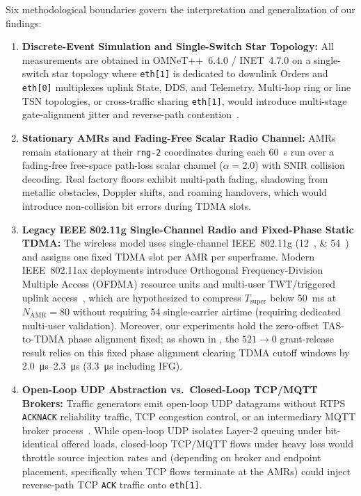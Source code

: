\documentclass[11pt,a4paper]{article}
\newcommand{\Namr}{\ensuremath{N_{\mathrm{AMR}}}}
\newcommand{\Tsuper}{\ensuremath{T_{\mathrm{super}}}}
\begin{document}
Six methodological boundaries govern the interpretation and generalization of our findings:
\begin{enumerate}[leftmargin=2.0em]
    \item \textbf{Discrete-Event Simulation and Single-Switch Star Topology:} All measurements are obtained in OMNeT++~6.4.0 / INET~4.7.0 on a single-switch star topology where \texttt{eth[1]} is dedicated to downlink Orders and \texttt{eth[0]} multiplexes uplink State, DDS, and Telemetry. Multi-hop ring or line TSN topologies, or cross-traffic sharing \texttt{eth[1]}, would introduce multi-stage gate-alignment jitter and reverse-path contention~\cite{seijo2022sharp}.
    \item \textbf{Stationary AMRs and Fading-Free Scalar Radio Channel:} AMRs remain stationary at their \texttt{rng-2} coordinates during each \qty{60}{\second} run over a fading-free free-space path-loss scalar channel ($\alpha=2.0$) with SNIR collision decoding. Real factory floors exhibit multi-path fading, shadowing from metallic obstacles, Doppler shifts, and roaming handovers, which would introduce non-collision bit errors during TDMA slots.
    \item \textbf{Legacy IEEE 802.11g Single-Channel Radio and Fixed-Phase Static TDMA:} The wireless model uses single-channel IEEE~802.11g (\qtylist{12;54}{\mbps}) and assigns one fixed TDMA slot per AMR per superframe. Modern IEEE~802.11ax deployments introduce Orthogonal Frequency-Division Multiple Access (OFDMA) resource units and multi-user TWT/triggered uplink access~\cite{cavalcanti2019extending}, which are hypothesized to compress $\Tsuper$ below \qty{50}{\milli\second} at $\Namr=80$ without requiring \qty{54}{\mbps} single-carrier airtime (requiring dedicated multi-user validation). Moreover, our experiments hold the zero-offset TAS-to-TDMA phase alignment fixed; as shown in , the $521 \to 0$ grant-release result relies on this fixed phase alignment clearing TDMA cutoff windows by \qtyrange{2.0}{2.3}{\micro\second} (\qty{3.3}{\micro\second} including IFG).
    \item \textbf{Open-Loop UDP Abstraction vs.\ Closed-Loop TCP/MQTT Brokers:} Traffic generators emit open-loop UDP datagrams without RTPS \texttt{ACKNACK} reliability traffic, TCP congestion control, or an intermediary MQTT broker process~\cite{omgrtps, mqtt5}. While open-loop UDP isolates Layer-2 queuing under bit-identical offered loads, closed-loop TCP/MQTT flows under heavy loss would throttle source injection rates and (depending on broker and endpoint placement, specifically when TCP flows terminate at the AMRs) could inject reverse-path TCP \texttt{ACK} traffic onto \texttt{eth[1]}.

\end{enumerate}
\end{document}
